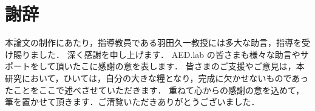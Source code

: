 \chapter{謝辞}
\label{chp:thanks}

本論文の制作にあたり，指導教員である羽田久一教授には多大な助言，指導を受け賜りました．
深く感謝を申し上げます．
AED.lab の皆さまも様々な助言やサポートをして頂いたこに感謝の意を表します．
皆さまのご支援やご意見は，本研究において，ひいては，自分の大きな糧となり，完成に欠かせないものであったことをここで述べさせていただきます．
重ねて心からの感謝の意を込めて，筆を置かせて頂きます．ご清覧いただきありがとうございました．
